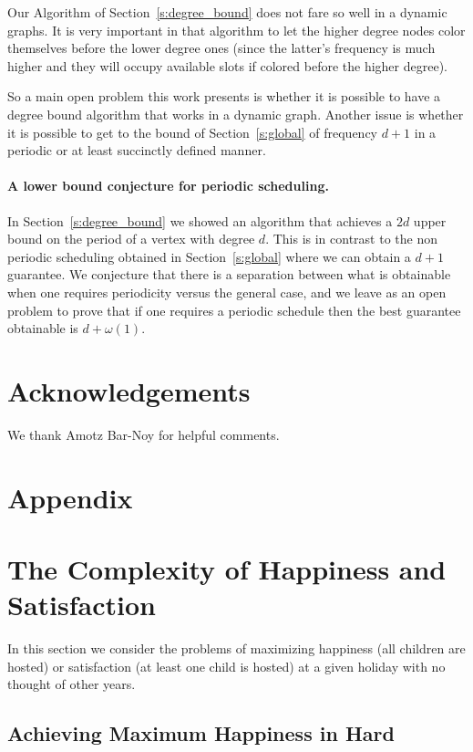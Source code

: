 \documentclass[11pt]{article}
\begin{document}
Our Algorithm  of Section~\ref{s:degree_bound} does not fare so well in a dynamic graphs. It is very important in that algorithm to let the higher degree nodes color themselves before the lower degree ones (since the latter's frequency is much higher and they will occupy available slots if colored before the higher degree).

So a main open problem this work presents is whether it is possible to have a degree bound algorithm that works in a dynamic graph. Another issue is whether it is possible to get to the bound of Section~\ref{s:global} of frequency $d+1$ in a periodic or at least succinctly defined manner.

\paragraph{A lower bound conjecture for periodic scheduling.} In Section~\ref{s:degree_bound} we showed an algorithm that achieves a $2d$ upper bound on the period of a vertex with degree $d$. This is in contrast to the non periodic scheduling obtained in Section~\ref{s:global} where we can obtain a $d+1$ guarantee. We conjecture that there is a separation between what is obtainable when one requires periodicity versus the general case, and we leave as an open problem to prove that if one requires a periodic schedule then the best guarantee obtainable is $d+\omega(1)$.

\section*{Acknowledgements}
We thank Amotz Bar-Noy for helpful comments.




\appendix
\section*{Appendix}

\section{The Complexity of Happiness and Satisfaction} \label{a:deluge}

In this section we consider the problems of maximizing happiness (all children are hosted) or
satisfaction (at least one child is hosted) at a given holiday with no thought of other years.

\subsection{Achieving Maximum Happiness in Hard}\label{ss:max}
\end{document}
